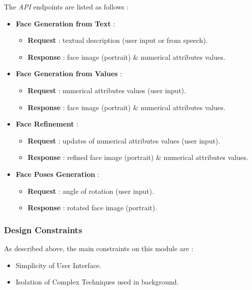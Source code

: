 The \emph{API} endpoints are listed as follows :
\begin{itemize}
    \item \textbf{Face Generation from Text} :
    \begin{itemize}
        \item \textbf{Request} : textual description (user input or from speech).
        \item \textbf{Response} : face image (portrait) \& numerical attributes values.
    \end{itemize}
    \item \textbf{Face Generation from Values} :
    \begin{itemize}
        \item \textbf{Request} : numerical attributes values (user input).
        \item \textbf{Response} : face image (portrait) \& numerical attributes values.
    \end{itemize}
    \item \textbf{Face Refinement} :
    \begin{itemize}
        \item \textbf{Request} : updates of numerical attributes values (user input).
        \item \textbf{Response} : refined face image (portrait) \& numerical attributes values.
    \end{itemize}
    \item \textbf{Face Poses Generation} :
    \begin{itemize}
        \item \textbf{Request} : angle of rotation (user input).
        \item \textbf{Response} : rotated face image (portrait).
    \end{itemize}
\end{itemize}

\subsubsection{Design Constraints}
As described above, the main constraints on this module are :

\begin{itemize}
    \item Simplicity of User Interface.
    \item Isolation of Complex Techniques used in background.
\end{itemize}
